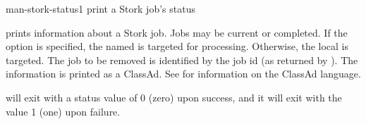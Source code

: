\begin{ManPage}{}{man-stork-status}{1}
{print a Stork job's status}

\Synopsis {}
\ToolArgsBase

\Storkname
{}


\Description 

 prints information about a Stork job.  
Jobs may be current or completed.
If the  option is specified,
the named  is targeted for processing.
Otherwise, the local  is targeted.
The job to be removed is identified by the job id 
(as returned by ).
The information is printed as a ClassAd.
See  for information
on the ClassAd language.

\begin{Options}
	\ToolArgsBaseDesc
	\StorknameDesc
\end{Options}

\ExitStatus

 will exit with a status value of 0 (zero) upon success,
and it will exit with the value 1 (one) upon failure.

\end{ManPage}
